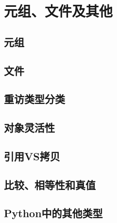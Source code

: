 \section{元组、文件及其他}
\subsection{元组}
\subsection{文件}
\subsection{重访类型分类}
\subsection{对象灵活性}
\subsection{引用VS拷贝}
\subsection{比较、相等性和真值}
\subsection{Python中的其他类型}
